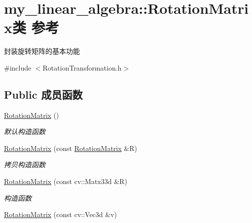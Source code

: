 \hypertarget{classmy__linear__algebra_1_1_rotation_matrix}{}\section{my\+\_\+linear\+\_\+algebra\+::Rotation\+Matrix类 参考}
\label{classmy__linear__algebra_1_1_rotation_matrix}


封装旋转矩阵的基本功能  




{\ttfamily \#include $<$Rotation\+Transformation.\+h$>$}

\subsection*{Public 成员函数}
\begin{DoxyCompactItemize}
\item 
\mbox{\label{classmy__linear__algebra_1_1_rotation_matrix_aba26c4b400653dcb44b7ff2b6764cde1}} 
\mbox{\hyperlink{classmy__linear__algebra_1_1_rotation_matrix_aba26c4b400653dcb44b7ff2b6764cde1}{Rotation\+Matrix}} ()
\begin{DoxyCompactList}\small\item\em 默认构造函数 \end{DoxyCompactList}\item 
\mbox{\label{classmy__linear__algebra_1_1_rotation_matrix_a5532902b495f756fdd4109423255c350}} 
\mbox{\hyperlink{classmy__linear__algebra_1_1_rotation_matrix_a5532902b495f756fdd4109423255c350}{Rotation\+Matrix}} (const \mbox{\hyperlink{classmy__linear__algebra_1_1_rotation_matrix}{Rotation\+Matrix}} \&R)
\begin{DoxyCompactList}\small\item\em 拷贝构造函数 \end{DoxyCompactList}\item 
\mbox{\hyperlink{classmy__linear__algebra_1_1_rotation_matrix_ace11939dfa128364be007d86d584f448}{Rotation\+Matrix}} (const cv\+::\+Matx33d \&R)
\begin{DoxyCompactList}\small\item\em 构造函数 \end{DoxyCompactList}\item 
\mbox{\hyperlink{classmy__linear__algebra_1_1_rotation_matrix_a4097eaf98ce60df31a53f332dd2a308e}{Rotation\+Matrix}} (const cv\+::\+Vec3d \&v)

\end{DoxyCompactItemize}
